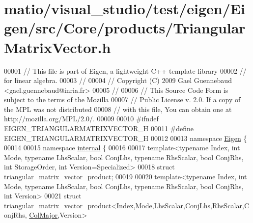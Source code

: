 \hypertarget{matio_2visual__studio_2test_2eigen_2_eigen_2src_2_core_2products_2_triangular_matrix_vector_8h_source}{}\section{matio/visual\+\_\+studio/test/eigen/\+Eigen/src/\+Core/products/\+Triangular\+Matrix\+Vector.h}
\label{matio_2visual__studio_2test_2eigen_2_eigen_2src_2_core_2products_2_triangular_matrix_vector_8h_source}

\begin{DoxyCode}
00001 \textcolor{comment}{// This file is part of Eigen, a lightweight C++ template library}
00002 \textcolor{comment}{// for linear algebra.}
00003 \textcolor{comment}{//}
00004 \textcolor{comment}{// Copyright (C) 2009 Gael Guennebaud <gael.guennebaud@inria.fr>}
00005 \textcolor{comment}{//}
00006 \textcolor{comment}{// This Source Code Form is subject to the terms of the Mozilla}
00007 \textcolor{comment}{// Public License v. 2.0. If a copy of the MPL was not distributed}
00008 \textcolor{comment}{// with this file, You can obtain one at http://mozilla.org/MPL/2.0/.}
00009 
00010 \textcolor{preprocessor}{#ifndef EIGEN\_TRIANGULARMATRIXVECTOR\_H}
00011 \textcolor{preprocessor}{#define EIGEN\_TRIANGULARMATRIXVECTOR\_H}
00012 
00013 \textcolor{keyword}{namespace }\hyperlink{namespace_eigen}{Eigen} \{
00014 
00015 \textcolor{keyword}{namespace }\hyperlink{namespaceinternal}{internal} \{
00016 
00017 \textcolor{keyword}{template}<\textcolor{keyword}{typename} Index, \textcolor{keywordtype}{int} Mode, \textcolor{keyword}{typename} LhsScalar, \textcolor{keywordtype}{bool} ConjLhs, \textcolor{keyword}{typename} RhsScalar, \textcolor{keywordtype}{bool} ConjRhs, \textcolor{keywordtype}{int} 
      StorageOrder, \textcolor{keywordtype}{int} Version=Specialized>
00018 \textcolor{keyword}{struct }triangular\_matrix\_vector\_product;
00019 
00020 \textcolor{keyword}{template}<\textcolor{keyword}{typename} Index, \textcolor{keywordtype}{int} Mode, \textcolor{keyword}{typename} LhsScalar, \textcolor{keywordtype}{bool} ConjLhs, \textcolor{keyword}{typename} RhsScalar, \textcolor{keywordtype}{bool} ConjRhs, \textcolor{keywordtype}{int} 
      Version>
00021 \textcolor{keyword}{struct }triangular\_matrix\_vector\_product<\hyperlink{namespace_eigen_a62e77e0933482dafde8fe197d9a2cfde}{Index},Mode,LhsScalar,ConjLhs,RhsScalar,ConjRhs,
      \hyperlink{group__enums_ggaacded1a18ae58b0f554751f6cdf9eb13a0cbd4bdd0abcfc0224c5fcb5e4f6669a}{ColMajor},Version>

\end{DoxyCode}
